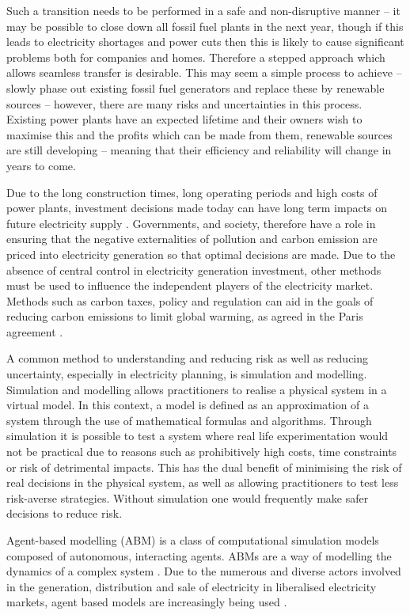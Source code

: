 {Such a transition needs to be performed in a safe and non-disruptive manner -- it may be possible to close down all fossil fuel plants in the next year, though if this leads to electricity shortages and power cuts then this is likely to cause significant problems both for companies and homes. Therefore a stepped approach which allows seamless transfer is desirable. This may seem a simple process to achieve -- slowly phase out existing fossil fuel generators and replace these by renewable sources -- however, there are many risks and uncertainties in this process. Existing power plants have an expected lifetime and their owners wish to maximise this and the profits which can be made from them, renewable sources are still developing -- meaning that their efficiency and reliability will change in years to come.
 }

 
Due to the long construction times, long operating periods and high costs of power plants, investment decisions made today can have long term impacts on future electricity supply \cite{Chappin2017}. Governments, and society, therefore have a role in ensuring that the negative externalities of pollution and carbon emission are priced into electricity generation so that optimal decisions are made. Due to the absence of central control in electricity generation investment, other methods must be used to influence the independent players of the electricity market. Methods such as carbon taxes, policy and regulation can aid in the goals of reducing carbon emissions to limit global warming, as agreed in the Paris agreement \cite{May2002}.

A common method to understanding and reducing risk as well as reducing uncertainty, especially in electricity planning, is simulation and modelling. Simulation and modelling allows practitioners to realise a physical system in a virtual model. In this context, a model is defined as an approximation of a system through the use of mathematical formulas and algorithms. Through simulation it is possible to test a system where real life experimentation would not be practical due to reasons such as prohibitively high costs, time constraints or risk of detrimental impacts. This has the dual benefit of minimising the risk of real decisions in the physical system, as well as allowing practitioners to test less risk-averse strategies. Without simulation one would frequently make safer decisions to reduce risk.

Agent-based modelling (ABM) is a class of computational simulation models composed of autonomous, interacting agents. ABMs are a way of modelling the dynamics of a complex system \cite{MacAl2010}. Due to the numerous and diverse actors involved in the generation, distribution and sale of electricity in liberalised electricity markets, agent based models are increasingly being used \cite{Zhou2007}.

